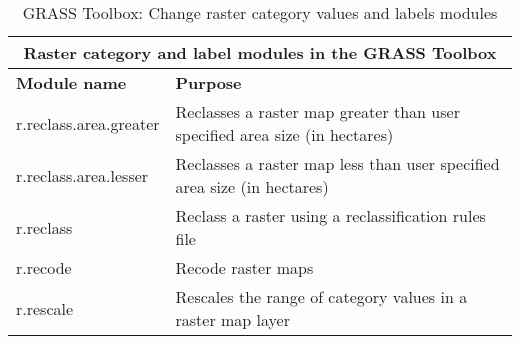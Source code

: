 \begin{table}[ht]
\centering
\caption{GRASS Toolbox: Change raster category values and labels modules}\medskip
 \begin{tabular}{|p{4cm}|p{12cm}|}
  \hline \multicolumn{2}{|c|}{\textbf{Raster category and label modules in the GRASS Toolbox}} \\
  \hline \textbf{Module name} & \textbf{Purpose} \\
  \hline r.reclass.area.greater & Reclasses a raster map greater than user
  specified area size (in hectares) \\
  \hline r.reclass.area.lesser & Reclasses a raster map less than user
  specified area size (in hectares) \\
  \hline r.reclass & Reclass a raster using a reclassification rules file \\
  \hline r.recode & Recode raster maps\\
  \hline r.rescale & Rescales the range of category values in a raster map
  layer \\
\hline
\end{tabular}
\end{table}


